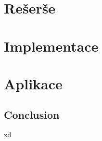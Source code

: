 \documentclass{ctuthesis}
\begin{document}
\maketitle



\part{Rešerše}

\part{Implementace}

\part{Aplikace}

\chapter{Conclusion}

xd~\cite{key}

\printbibliography{}
\end{document}
